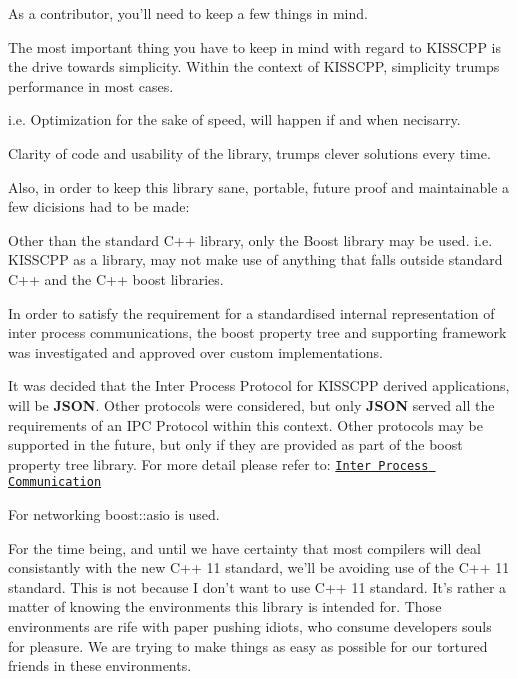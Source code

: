 As a contributor, you'll need to keep a few things in mind.

The most important thing you have to keep in mind with regard to K\-I\-S\-S\-C\-P\-P is the drive towards simplicity. Within the context of K\-I\-S\-S\-C\-P\-P, simplicity trumps performance in most cases.

i.\-e. Optimization for the sake of speed, will happen if and when necisarry.

Clarity of code and usability of the library, trumps clever solutions every time.

Also, in order to keep this library sane, portable, future proof and maintainable a few dicisions had to be made\-:


\begin{DoxyEnumerate}
\item Other than the standard C++ library, only the Boost library may be used. i.\-e. K\-I\-S\-S\-C\-P\-P as a library, may not make use of anything that falls outside standard C++ and the C++ boost libraries.
\item In order to satisfy the requirement for a standardised internal representation of inter process communications, the boost property tree and supporting framework was investigated and approved over custom implementations.
\item It was decided that the Inter Process Protocol for K\-I\-S\-S\-C\-P\-P derived applications, will be {\bfseries J\-S\-O\-N}. Other protocols were considered, but only {\bfseries J\-S\-O\-N} served all the requirements of an I\-P\-C Protocol within this context. Other protocols may be supported in the future, but only if they are provided as part of the boost property tree library. For more detail please refer to\-: \href{md_inter_process_communication.html}{\tt Inter Process Communication}
\item For networking boost\-::asio is used.
\item For the time being, and until we have certainty that most compilers will deal consistantly with the new C++ 11 standard, we'll be avoiding use of the C++ 11 standard. This is not because I don't want to use C++ 11 standard. It's rather a matter of knowing the environments this library is intended for. Those environments are rife with paper pushing idiots, who consume developers souls for pleasure. We are trying to make things as easy as possible for our tortured friends in these environments. 
\end{DoxyEnumerate}